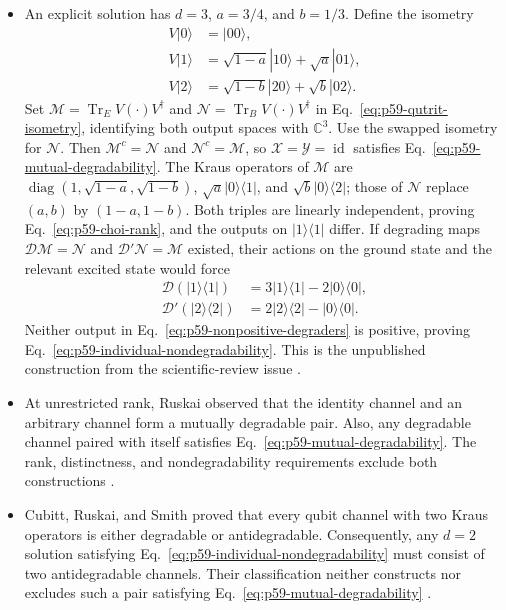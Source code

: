 \begin{itemize}
  \item An explicit solution has $d=3$, $a=3/4$, and $b=1/3$. Define the
isometry
\begin{equation}
  \begin{aligned}
    V|0\rangle&=|00\rangle,\\
    V|1\rangle&=\sqrt{1-a}|10\rangle+\sqrt a|01\rangle,\\
    V|2\rangle&=\sqrt{1-b}|20\rangle+\sqrt b|02\rangle.
  \end{aligned}
  \label{eq:p59-qutrit-isometry}
\end{equation}
Set $\mathcal M=\operatorname{Tr}_E V(\cdot)V^\dagger$ and
$\mathcal N=\operatorname{Tr}_B V(\cdot)V^\dagger$ in
Eq.~\eqref{eq:p59-qutrit-isometry}, identifying both output spaces with
$\mathbb C^3$. Use the swapped isometry for $\mathcal N$. Then
$\mathcal M^c=\mathcal N$ and $\mathcal N^c=\mathcal M$, so
$\mathcal X=\mathcal Y=\operatorname{id}$ satisfies
Eq.~\eqref{eq:p59-mutual-degradability}.
The Kraus operators of $\mathcal M$ are
$\operatorname{diag}(1,\sqrt{1-a},\sqrt{1-b})$,
$\sqrt a|0\rangle\langle1|$, and $\sqrt b|0\rangle\langle2|$;
those of $\mathcal N$ replace $(a,b)$ by $(1-a,1-b)$.
Both triples are linearly independent, proving
Eq.~\eqref{eq:p59-choi-rank}, and the outputs on
$|1\rangle\langle1|$ differ.
If degrading maps $\mathcal D\mathcal M=\mathcal N$ and
$\mathcal D'\mathcal N=\mathcal M$ existed, their actions on the ground
state and the relevant excited state would force
\begin{equation}
  \begin{aligned}
    \mathcal D(|1\rangle\langle1|)
      &=3|1\rangle\langle1|-2|0\rangle\langle0|,\\
    \mathcal D'(|2\rangle\langle2|)
      &=2|2\rangle\langle2|-|0\rangle\langle0|.
  \end{aligned}
  \label{eq:p59-nonpositive-degraders}
\end{equation}
Neither output in Eq.~\eqref{eq:p59-nonpositive-degraders} is positive,
proving Eq.~\eqref{eq:p59-individual-nondegradability}. This is the
unpublished construction from the scientific-review issue
.

  \item At unrestricted rank, Ruskai observed that the identity channel and an
  arbitrary channel form a mutually degradable pair.  Also, any degradable
  channel paired with itself satisfies
  Eq.~\eqref{eq:p59-mutual-degradability}.  The rank, distinctness, and
  nondegradability requirements exclude both constructions
  .

  \item Cubitt, Ruskai, and Smith proved that every qubit channel with two
  Kraus operators is either degradable or antidegradable.  Consequently, any
  $d=2$ solution satisfying Eq.~\eqref{eq:p59-individual-nondegradability}
  must consist of two antidegradable channels.  Their classification neither
  constructs nor excludes such a pair satisfying
  Eq.~\eqref{eq:p59-mutual-degradability}
  .
\end{itemize}

